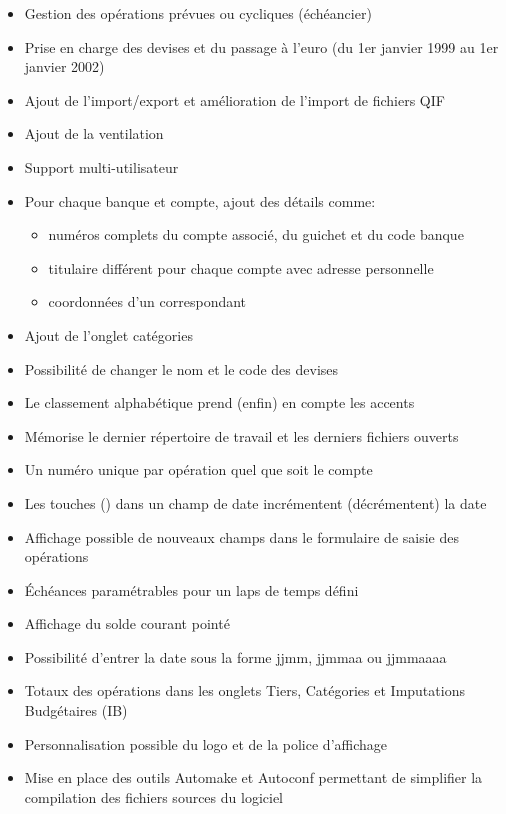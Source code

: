 \begin{itemize}
	\item Gestion des opérations prévues ou cycliques (échéancier) 
	\item Prise en charge des devises et du passage à l'euro (du 1er janvier 1999 au 1er janvier 2002)
	\item Ajout de l'import/export et amélioration de l'import de fichiers \gls{QIF}
	\item Ajout de la ventilation
	\item Support multi-utilisateur
	\item Pour chaque banque et compte, ajout des détails comme:
		\begin{itemize}
		\item numéros complets du compte associé, du guichet et du code banque
		\item titulaire différent pour chaque compte avec adresse personnelle
		\item coordonnées d'un correspondant
		\end{itemize}
	\item Ajout de l'onglet catégories
	\item Possibilité de changer le nom et le code des devises
	\item Le classement alphabétique prend (enfin) en compte les accents
	\item Mémorise le dernier répertoire de travail et les derniers fichiers ouverts
	\item Un numéro unique par opération quel que soit le compte
	\item Les touches \key{+} (\key{-}) dans un champ de date incrémentent (décrémentent) la date
	\item Affichage possible de nouveaux champs dans le formulaire de saisie des opérations 
	\item Échéances paramétrables pour un laps de temps défini
	\item Affichage du solde courant pointé
	\item Possibilité d'entrer la date sous la forme jjmm, jjmmaa ou jjmmaaaa
	\item Totaux des opérations dans les onglets Tiers, Catégories et Imputations Budgétaires (IB)
	\item Personnalisation possible du logo et de la police d'affichage
	\item Mise en place des outils Automake et Autoconf permettant de simplifier la compilation des fichiers sources du logiciel
\end{itemize}

